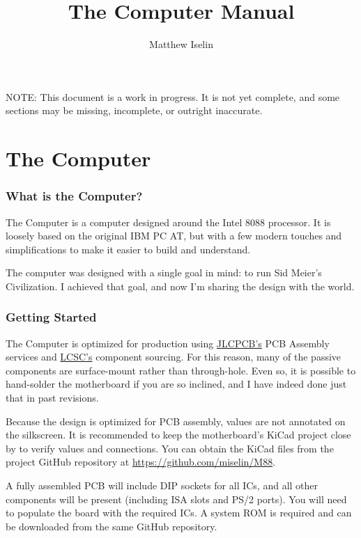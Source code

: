 \documentclass[twoside,10pt,letterpaper]{refart}
\title{The \m88 Computer Manual}
\author{Matthew Iselin}
\date{}
\begin{document}
\maketitle
\raggedright
\footnotesize

NOTE: This document is a work in progress. It is not yet complete, and some sections may be missing, incomplete, or outright inaccurate.

\tableofcontents

\newpage

\part{The  Computer}

\section{What is the  Computer?}
The  Computer is a computer designed around the Intel 8088 processor.
It is loosely based on the original IBM PC AT, but with a few modern touches and
simplifications to make it easier to build and understand.

The computer was designed with a single goal in mind: to run Sid Meier's Civilization.
I achieved that goal, and now I'm sharing the design with the world.

\section{Getting Started}
The  Computer is optimized for production using \href{https://jlcpcb.com}{JLCPCB's}
PCB Assembly services and \href{https://lcsc.com}{LCSC's} component sourcing. For this reason,
many of the passive components are surface-mount rather than through-hole. Even so, it is
possible to hand-solder the motherboard if you are so inclined, and I have indeed done just that
in past revisions.

Because the design is optimized for PCB assembly, values are not annotated on the silkscreen.
It is recommended to keep the motherboard's KiCad project close by to verify values and connections.
You can obtain the KiCad files from the project GitHub repository at \url{https://github.com/miselin/M88}.

A fully assembled PCB will include DIP sockets for all ICs, and all other components will be
present (including ISA slots and PS/2 ports). You will need to populate the board with the
required ICs. A system ROM is required and can be downloaded from the same GitHub repository.
\end{document}
